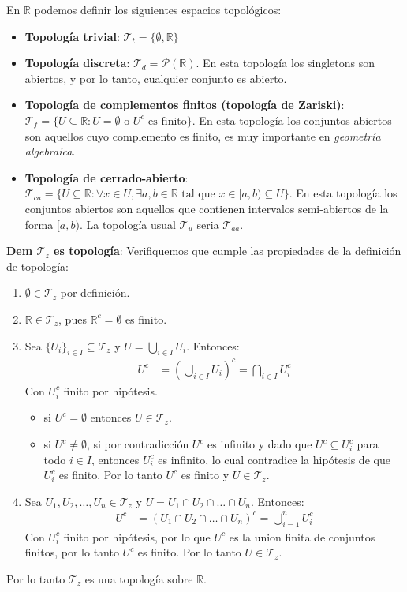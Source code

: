 En $\mathbb{R}$ podemos definir los siguientes espacios topológicos:
\begin{itemize}
    \item \textbf{Topología trivial}: $\mathcal{T}_t = \{\emptyset, \mathbb{R}\}$
    \item \textbf{Topología discreta}: $\mathcal{T}_d = \mathscr P(\mathbb{R})$. En esta topología los singletons son abiertos, y por lo tanto, cualquier conjunto es abierto.
    \item \textbf{Topología de complementos finitos (topología de Zariski)}: $\mathcal{T}_f = \{U \subseteq \mathbb{R} : U = \emptyset \text{ o } U^c \text{ es finito}\}$. En esta topología los conjuntos abiertos son aquellos cuyo complemento es finito, es muy importante en \textit{geometría algebraica}.
    \item \textbf{Topología de cerrado-abierto}: $\mathcal{T}_{ca} = \{U \subseteq \mathbb{R} : \forall x \in U, \exists a,b \in \mathbb R \text{ tal que } x \in [a,b) \subseteq U\}$. En esta topología los conjuntos abiertos son aquellos que contienen intervalos semi-abiertos de la forma $[a,b)$. La topología usual $\mathcal{T}_u$ seria $\mathcal{T}_{aa}$.
\end{itemize}

\textbf{Dem $\mathcal T_z$ es topología}: 
Verifiquemos que cumple las propiedades de la definición de topología:
\begin{enumerate}
    \item $\emptyset \in \mathcal{T}_z$  por definición.
    \item $\mathbb{R} \in \mathcal{T}_z$, pues $\mathbb{R}^c = \emptyset$ es finito.
    \item Sea $\{U_i\}_{i \in I} \subseteq \mathcal{T}_z$ y $U = \bigcup_{i \in I} U_i$. Entonces:
    \begin{align*}
        U^c &= \left(\bigcup_{i \in I} U_i\right)^c = \bigcap_{i \in I} U_i^c
    \end{align*}
    Con $U_i^c$ finito por hipótesis.
    \begin{itemize}
        \item si $U^c = \emptyset$ entonces $U \in \mathcal{T}_z$.
        \item si $U^c \neq \emptyset$, si por contradicción $U^c$ es infinito y dado que $U^c \subseteq U_i^c$ para todo $i \in I$, entonces $U_i^c$ es infinito, lo cual contradice la hipótesis de que $U_i^c$ es finito. Por lo tanto $U^c$ es finito y $U \in \mathcal{T}_z$.
    \end{itemize}
    \item Sea $U_1, U_2, \dots, U_n \in \mathcal{T}_z$ y $U = U_1 \cap U_2 \cap \dots \cap U_n$. Entonces:
    \begin{align*}
        U^c &= (U_1 \cap U_2 \cap \dots \cap U_n)^c = \bigcup_{i=1}^n U_i^c
    \end{align*}
    Con $U_i^c$ finito por hipótesis, por lo que $U^c$ es la union finita de conjuntos finitos, por lo tanto $U^c$ es finito. Por lo tanto $U \in \mathcal{T}_z$.
\end{enumerate}
Por lo tanto $\mathcal{T}_z$ es una topología sobre $\mathbb{R}$.

